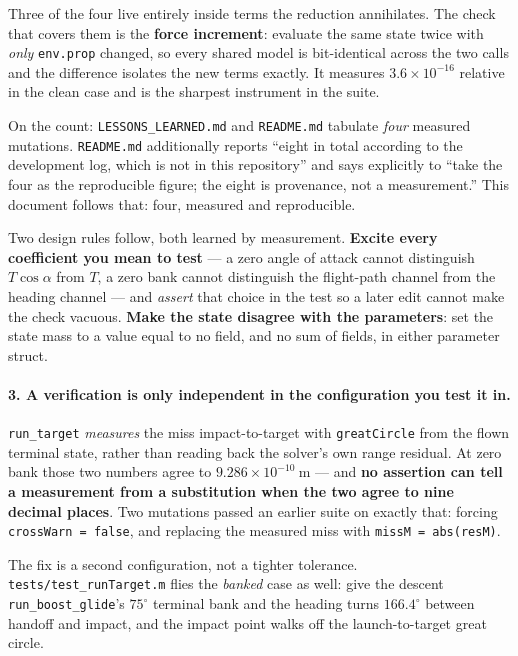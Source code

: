 \documentclass[11pt]{article}
\newcommand{\code}[1]{\texttt{#1}}
\begin{document}
Three of the four live entirely inside terms the reduction annihilates. The
check that covers them is the \textbf{force increment}: evaluate the same state
twice with \emph{only} \code{env.prop} changed, so every shared model is
bit-identical across the two calls and the difference isolates the new terms
exactly. It measures $3.6\times10^{-16}$ relative in the clean case and is the
sharpest instrument in the suite.

On the count: \code{LESSONS\_LEARNED.md} and \code{README.md} tabulate
\emph{four} measured mutations. \code{README.md} additionally reports ``eight
in total according to the development log, which is not in this repository''
and says explicitly to ``take the four as the reproducible figure; the eight is
provenance, not a measurement.'' This document follows that: four, measured and
reproducible.

Two design rules follow, both learned by measurement. \textbf{Excite every
coefficient you mean to test} --- a zero angle of attack cannot distinguish
$T\cos\alpha$ from $T$, a zero bank cannot distinguish the flight-path channel
from the heading channel --- and \emph{assert} that choice in the test so a
later edit cannot make the check vacuous. \textbf{Make the state disagree with
the parameters}: set the state mass to a value equal to no field, and no sum of
fields, in either parameter struct.

\paragraph{3. A verification is only independent in the configuration you test
it in.}

\code{run\_target} \emph{measures} the miss impact-to-target with
\code{greatCircle} from the flown terminal state, rather than reading back the
solver's own range residual. At zero bank those two numbers agree to
$9.286\times10^{-10}~\mathrm{m}$ --- and \textbf{no assertion can tell a
measurement from a substitution when the two agree to nine decimal places}. Two
mutations passed an earlier suite on exactly that: forcing
\code{crossWarn = false}, and replacing the measured miss with
\code{missM = abs(resM)}.

The fix is a second configuration, not a tighter tolerance.
\code{tests/test\_runTarget.m} flies the \emph{banked} case as well: give the
descent \code{run\_boost\_glide}'s $75^\circ$ terminal bank and the heading
turns $166.4^\circ$ between handoff and impact, and the impact point walks off
the launch-to-target great circle.
\end{document}
